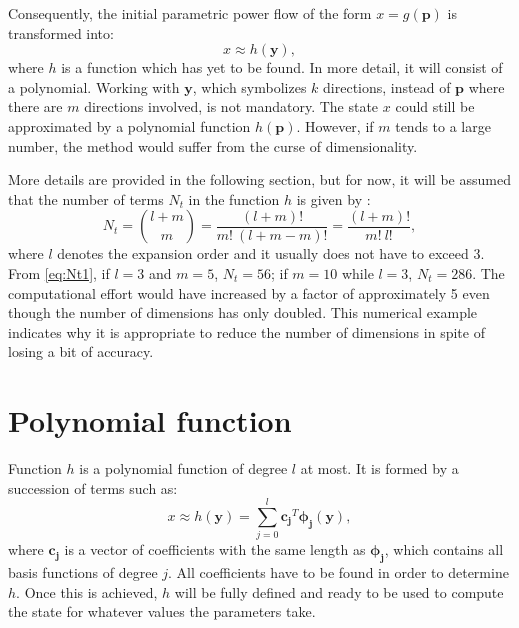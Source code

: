 Consequently, the initial parametric power flow of the form $x=g(\mathbf{p})$ is transformed into:
\begin{equation}
  x \approx h(\mathbf{y}),
  \label{eq:y2}
\end{equation}
where $h$ is a function which has yet to be found. In more detail, it will consist of a polynomial. Working with $\mathbf{y}$, which symbolizes $k$ directions, instead of $\mathbf{p}$ where there are $m$ directions involved, is not mandatory. The state $x$ could still be approximated by a polynomial function $h(\mathbf{p})$. However, if $m$ tends to a large number, the method would suffer from the curse of dimensionality. 

More details are provided in the following section, but for now, it will be assumed that the number of terms $N_t$ in the function $h$ is given by \cite{shen2020, zhou2016}:
\begin{equation}
  N_{t} = \binom{l+m}{m} = \frac{(l + m)!}{m! \ (l + m - m)!} = \frac{(l + m)!}{m! \ l!}  ,
  \label{eq:Nt1}
\end{equation}
where $l$ denotes the expansion order and it usually does not have to exceed 3. From \eqref{eq:Nt1}, if $l=3$ and $m=5$, $N_t = 56$; if $m=10$ while $l=3$, $N_t = 286$. The computational effort would have increased by a factor of approximately 5 even though the number of dimensions has only doubled. This numerical example indicates why it is appropriate to reduce the number of dimensions in spite of losing a bit of accuracy. 




\section{Polynomial function}
Function $h$ is a polynomial function of degree $l$ at most. It is formed by a succession of terms such as:
\begin{equation}
  x \approx h(\mathbf{y}) = \sum_{j=0}^l \mathbf{c_j}^T \mathbf{\phi_j}(\mathbf{y}),
  \label{eq:poly1}
\end{equation}
where $\mathbf{c_j}$ is a vector of coefficients with the same length as $\mathbf{\phi_j}$, which contains all basis functions of degree $j$. All coefficients have to be found in order to determine $h$. Once this is achieved, $h$ will be fully defined and ready to be used to compute the state for whatever values the parameters take. 


